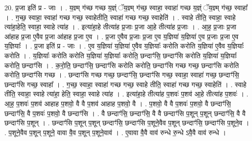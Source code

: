\documentclass[17pt]{extarticle}
\begin{document}
20. प्र॒जा इति॑ प्र - जाः । . य॒ज्ञ्म् ग॑च्छ गच्छ य॒ज्ञ्ं ॅय॒ज्ञ्म् ग॑च्छ॒ स्वाहा॒ स्वाहा॑ गच्छ य॒ज्ञ्ं ॅय॒ज्ञ्म् ग॑च्छ॒ स्वाहा᳚ । . ग॒च्छ॒ स्वाहा॒ स्वाहा॑ गच्छ गच्छ॒ स्वाहेतीति॒ स्वाहा॑ गच्छ गच्छ॒ स्वाहेति॑ । . स्वाहे तीति॒ स्वाहा॒ स्वाहे त्या॑हा॒हेति॒ स्वाहा॒ स्वाहे त्या॑ह । . इत्या॑हा॒हे तीत्या॑ह प्र॒जाः प्र॒जा आ॒हे तीत्या॑ह प्र॒जाः । . आ॒ह॒ प्र॒जाः प्र॒जा आ॑हाह प्र॒जा ए॒वैव प्र॒जा आ॑हाह प्र॒जा ए॒व । . प्र॒जा ए॒वैव प्र॒जाः प्र॒जा ए॒व य॒ज्ञिया॑ य॒ज्ञिया॑ ए॒व प्र॒जाः प्र॒जा ए॒व य॒ज्ञियाः᳚ । . प्र॒जा इति॑ प्र - जाः । . ए॒व य॒ज्ञिया॑ य॒ज्ञिया॑ ए॒वैव य॒ज्ञियाः᳚ करोति करोति य॒ज्ञिया॑ ए॒वैव य॒ज्ञियाः᳚ करोति । . य॒ज्ञियाः᳚ करोति करोति य॒ज्ञिया॑ य॒ज्ञियाः᳚ करोति॒ छन्दाꣳ॑सि॒ छन्दाꣳ॑सि करोति य॒ज्ञिया॑ य॒ज्ञियाः᳚ करोति॒ छन्दाꣳ॑सि । . क॒रो॒ति॒ छन्दाꣳ॑सि॒ छन्दाꣳ॑सि करोति करोति॒ छन्दाꣳ॑सि गच्छ गच्छ॒ छन्दाꣳ॑सि करोति करोति॒ छन्दाꣳ॑सि गच्छ । . छन्दाꣳ॑सि गच्छ गच्छ॒ छन्दाꣳ॑सि॒ छन्दाꣳ॑सि गच्छ॒ स्वाहा॒ स्वाहा॑ गच्छ॒ छन्दाꣳ॑सि॒ छन्दाꣳ॑सि गच्छ॒ स्वाहा᳚ । . ग॒च्छ॒ स्वाहा॒ स्वाहा॑ गच्छ गच्छ॒ स्वाहे तीति॒ स्वाहा॑ गच्छ गच्छ॒ स्वाहेति॑ । . स्वाहे तीति॒ स्वाहा॒ स्वाहे त्या॑हा॒ हेति॒ स्वाहा॒ स्वाहे त्या॑ह । . इत्या॑हा॒हे तीत्या॑ह प॒शवः॑ प॒शव॑ आ॒हे तीत्या॑ह प॒शवः॑ । . आ॒ह॒ प॒शवः॑ प॒शव॑ आहाह प॒शवो॒ वै वै प॒शव॑ आहाह प॒शवो॒ वै । . प॒शवो॒ वै वै प॒शवः॑ प॒शवो॒ वै छन्दाꣳ॑सि॒ छन्दाꣳ॑सि॒ वै प॒शवः॑ प॒शवो॒ वै छन्दाꣳ॑सि । . वै छन्दाꣳ॑सि॒ छन्दाꣳ॑सि॒ वै वै छन्दाꣳ॑सि प॒शून् प॒शून् छन्दाꣳ॑सि॒ वै वै छन्दाꣳ॑सि प॒शून् । . छन्दाꣳ॑सि प॒शून् प॒शून् छन्दाꣳ॑सि॒ छन्दाꣳ॑सि प॒शूने॒वैव प॒शून् छन्दाꣳ॑सि॒ छन्दाꣳ॑सि प॒शूने॒व । . प॒शूने॒वैव प॒शून् प॒शूने॒ वावा वै॒व प॒शून् प॒शूने॒वाव॑ । . ए॒वावा वै॒वै वाव॑ रुन्धे रु॒न्धे ऽवै॒वै वाव॑ रुन्धे । \newline
\end{document}
